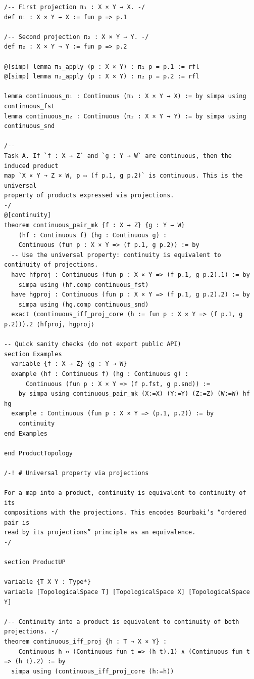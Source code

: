 \documentclass[11pt]{article}
\theoremstyle{definition}
\begin{document}
\begin{lstlisting}[language=lean]
/-- First projection π₁ : X × Y → X. -/
def π₁ : X × Y → X := fun p => p.1

/-- Second projection π₂ : X × Y → Y. -/
def π₂ : X × Y → Y := fun p => p.2

@[simp] lemma π₁_apply (p : X × Y) : π₁ p = p.1 := rfl
@[simp] lemma π₂_apply (p : X × Y) : π₂ p = p.2 := rfl

lemma continuous_π₁ : Continuous (π₁ : X × Y → X) := by simpa using continuous_fst
lemma continuous_π₂ : Continuous (π₂ : X × Y → Y) := by simpa using continuous_snd

/--
Task A. If `f : X → Z` and `g : Y → W` are continuous, then the induced product
map `X × Y → Z × W, p ↦ (f p.1, g p.2)` is continuous. This is the universal
property of products expressed via projections.
-/
@[continuity]
theorem continuous_pair_mk {f : X → Z} {g : Y → W}
    (hf : Continuous f) (hg : Continuous g) :
    Continuous (fun p : X × Y => (f p.1, g p.2)) := by
  -- Use the universal property: continuity is equivalent to continuity of projections.
  have hfproj : Continuous (fun p : X × Y => (f p.1, g p.2).1) := by
    simpa using (hf.comp continuous_fst)
  have hgproj : Continuous (fun p : X × Y => (f p.1, g p.2).2) := by
    simpa using (hg.comp continuous_snd)
  exact (continuous_iff_proj_core (h := fun p : X × Y => (f p.1, g p.2))).2 ⟨hfproj, hgproj⟩

-- Quick sanity checks (do not export public API)
section Examples
  variable {f : X → Z} {g : Y → W}
  example (hf : Continuous f) (hg : Continuous g) :
      Continuous (fun p : X × Y => (f p.fst, g p.snd)) :=
    by simpa using continuous_pair_mk (X:=X) (Y:=Y) (Z:=Z) (W:=W) hf hg
  example : Continuous (fun p : X × Y => (p.1, p.2)) := by
    continuity
end Examples

end ProductTopology

/-! # Universal property via projections

For a map into a product, continuity is equivalent to continuity of its
compositions with the projections. This encodes Bourbaki’s “ordered pair is
read by its projections” principle as an equivalence.
-/

section ProductUP

variable {T X Y : Type*}
variable [TopologicalSpace T] [TopologicalSpace X] [TopologicalSpace Y]

/-- Continuity into a product is equivalent to continuity of both projections. -/
theorem continuous_iff_proj {h : T → X × Y} :
    Continuous h ↔ (Continuous fun t => (h t).1) ∧ (Continuous fun t => (h t).2) := by
  simpa using (continuous_iff_proj_core (h:=h))


\end{lstlisting}
\end{document}
